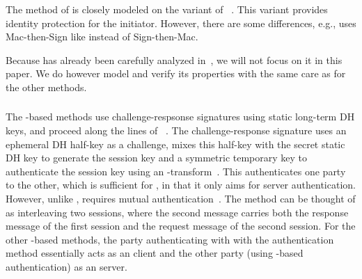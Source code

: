 \spacehack
\subsubsection{\mSigma{}}
\label{sec:sigma}
The \mSigSig{} method of \mEdhoc{} is closely modeled on the \mSigmaI{} variant of \mSigma{}~\cite{sigma}. This variant provides identity protection for the initiator. However, there are some differences, e.g., \mSigSig{} uses Mac-then-Sign like \mTls{} instead of Sign-then-Mac.

Because \mSigSig{} has already been carefully analyzed in~\cite{DBLP:conf/secsr/BruniJPS18}, we will not focus 
on it in this paper. We do however model \mSigSig{} and verify its properties with the same care as for the other methods.
%

\spacehack
\subsubsection{\mOptls{}}
\label{sec:optls}
The \mStat-based methods use challenge-respsonse signatures using static
long-term DH keys, and proceed along the lines of
\mOptls~\cite{DBLP:conf/eurosp/KrawczykW16}.
%
The challenge-response signature uses an ephemeral DH half-key as a challenge, mixes this half-key with the secret static DH key to generate the session key and a symmetric temporary key to authenticate the session key using an \mAead{}-transform~\cite{DBLP:conf/eurosp/KrawczykW16,aead}.
%
This authenticates one party to the other, which is sufficient for \mOptls, in that it only aims for server authentication.
%
%
However, unlike \mOptls{}, \mEdhoc{} requires mutual authentication~\cite{ietf-lake-reqs-04}. The \mStatStat{} method can be thought of as interleaving two \mOptls{} sessions, where the second \mEdhoc{} message carries both the response message of the first \mOptls{} session and the request message of the second \mOptls{} session. For the other \mStat{}-based methods, the party authenticating with with the \mStat{} authentication method essentially acts as an \mOptls{} client and the other party (using \mSig{}-based authentication) as an \mOptls{} server. 


